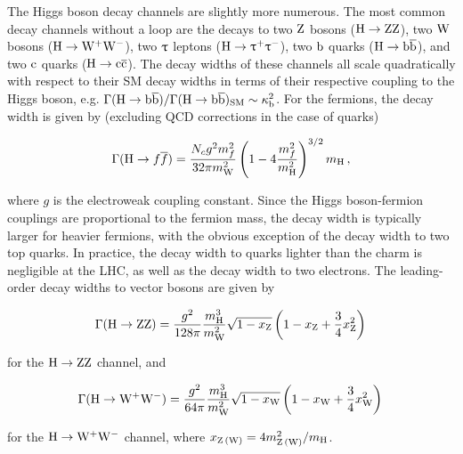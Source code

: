 The Higgs boson decay channels are slightly more numerous.
% 
The most common decay channels without a loop are the decays to two $\mathrm{Z}$ bosons ($\mathrm{H}\to\mathrm{Z}\mathrm{Z}$), two $\mathrm{W}$ bosons ($\mathrm{H}\to\mathrm{W}^+\mathrm{W}^-$), two $\uptau$ leptons ($\mathrm{H}\to\uptau^+\uptau^-$), two $\mathrm{b}$ quarks ($\mathrm{H}\to\mathrm{b}\overline{\mathrm{b}}$), and two $\mathrm{c}$ quarks ($\mathrm{H}\to\mathrm{c}\overline{\mathrm{c}}$).
% 
The decay widths of these channels all scale quadratically with respect to their SM decay widths in terms of their respective coupling to the Higgs boson, e.g. $\Gamma(\mathrm{H}\to\mathrm{b}\overline{\mathrm{b}}) / \Gamma(\mathrm{H}\to\mathrm{b}\overline{\mathrm{b}})_\text{SM} \sim \kappa_{\mathrm{b}}^2$.
% 
For the fermions, the decay width is given by (excluding QCD corrections in the case of quarks)~\cite{higgshunter}
% 
\begin{linenomath*}
\begin{equation}
\label{eq:brhff}
\Gamma(\mathrm{H} \to f\overline{f})
=
\frac{N_c g^2 m_f^2}{32\pi m_\mathrm{W}^2}
\left( 1-4\frac{m_f^2}{m_{\mathrm{H}}^2} \right)^{ 3/2 }
m_{\mathrm{H}} 
\,,
\end{equation}
\end{linenomath*}
% 
where $g$ is the electroweak coupling constant.
% 
Since the Higgs boson-fermion couplings are proportional to the fermion mass, the decay width is typically larger for heavier fermions, with the obvious exception of the decay width to two top quarks.
% 
In practice, the decay width to quarks lighter than the charm is negligible at the LHC, as well as the decay width to two electrons.
% 
The leading-order decay widths to vector bosons are given by~\cite{higgshunter}
% 
\begin{linenomath*}
\begin{equation}
\Gamma(\mathrm{H}\to\mathrm{Z}\mathrm{Z})
=
\frac{g^2}{128\pi} \frac{m_{\mathrm{H}}^3}{m_\mathrm{W}^2}
\sqrt{1-x_\mathrm{Z}}
\left( 1 - x_\mathrm{Z} + \frac{3}{4} x_\mathrm{Z}^2 \right)
\,
\end{equation}
\end{linenomath*}
% 
for the $\mathrm{H}\to\mathrm{Z}\mathrm{Z}$ channel, and
% 
\begin{linenomath*}
\begin{equation}
\Gamma(\mathrm{H}\to\mathrm{W}^+\mathrm{W}^-)
=
\frac{g^2}{64\pi} \frac{m_{\mathrm{H}}^3}{m_\mathrm{W}^2}
\sqrt{1-x_\mathrm{W}}
\left( 1 - x_\mathrm{W} + \frac{3}{4} x_\mathrm{W}^2 \right)
\,
\end{equation}
\end{linenomath*}
% 
for the $\mathrm{H}\to\mathrm{W}^+\mathrm{W}^-$ channel, where $x_{\mathrm{Z} \, (\mathrm{W})} = 4 m_{\mathrm{Z}\,(\mathrm{W})}^2 / m_{\mathrm{H}}$.



